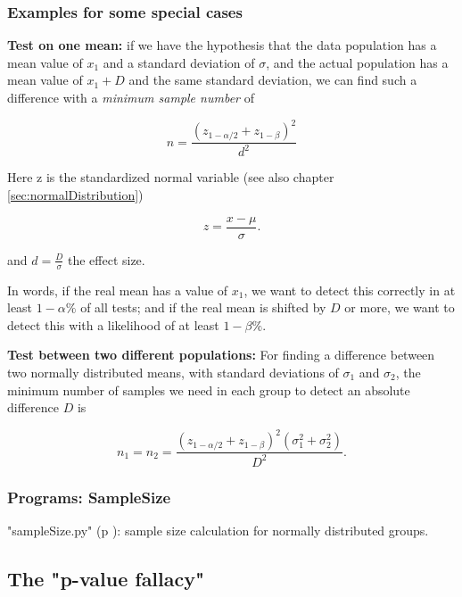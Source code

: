 \subsubsection{Examples for some special cases}

\textbf{Test on one mean:} if we have the hypothesis that the data population has a mean value of $x_1$ and a standard deviation of $\sigma$, and the actual population has a mean value of $x_1+D$ and the same standard deviation, we can find such a difference with a \emph{minimum sample number} of

\begin{equation}
  n = \frac{{({z_{1 - \alpha /2}} + {z_{1 - \beta }})}^2}{d^2}
\end{equation}

Here z is the standardized normal variable (see also chapter \ref{sec:normalDistribution})

\begin{equation}
  z = \frac{x-\mu}{\sigma} .
\end{equation}

and $d = \frac{D}{\sigma}$ the effect size.

In words, if the real mean has a value of $x_1$, we want to detect this correctly in at least $1-\alpha\%$ of all tests; and if the real mean is shifted by $D$ or more, we want to detect this with a likelihood of at least $1-\beta\%$.

\textbf{Test between two different populations:}
For finding a difference between two normally distributed means, with standard deviations of $\sigma_1$ and $\sigma_2$, the minimum number of samples we need in each group to detect an absolute difference $D$ is

\begin{equation}
  {n_1} = {n_2} = \frac{{({z_{1 - \alpha /2}} + {z_{1 - \beta }})}^2(\sigma _1^2 + \sigma _2^2)}{D^2} .
\end{equation}

\subsubsection{Programs: SampleSize}

\PyImg "sampleSize.py" (p \pageref{py:sampleSize}): sample size calculation for normally distributed groups.


\subsection{The "p-value fallacy"}

